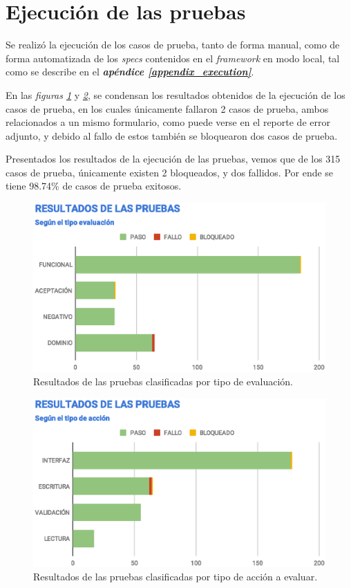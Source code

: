 \section{Ejecución de las pruebas}
Se realizó la ejecución de los casos de prueba, tanto de forma manual, como de
forma automatizada de los \emph{specs} contenidos en el \emph{framework} en modo
local, tal como se describe en el
\emph{\textbf{apéndice \ref{appendix_execution}}}.

En las \emph{figuras \ref{results-tests}} y \emph{\ref{results-type}}, se
condensan los resultados obtenidos de la ejecución de los casos de prueba, en
los cuales únicamente fallaron 2 casos de prueba, ambos relacionados a un mismo
formulario, como puede verse en el reporte de error adjunto, y debido al fallo
de estos también se bloquearon dos casos de prueba.

Presentados los resultados de la ejecución de las pruebas, vemos que de los 315
casos de prueba, únicamente existen 2 bloqueados, y dos fallidos. Por ende se
tiene 98.74\% de casos de prueba exitosos.

\begin{figure}
\centering
\includegraphics[width=1.0\textwidth]{graphics/results-tests.eps}
\caption{Resultados de las pruebas clasificadas por tipo de evaluación.}
\label{results-tests}
\end{figure}

\begin{figure}
\centering
\includegraphics[width=1.0\textwidth]{graphics/results-type.eps}
\caption{Resultados de las pruebas clasificadas por tipo de acción a evaluar.}
\label{results-type}
\end{figure}

